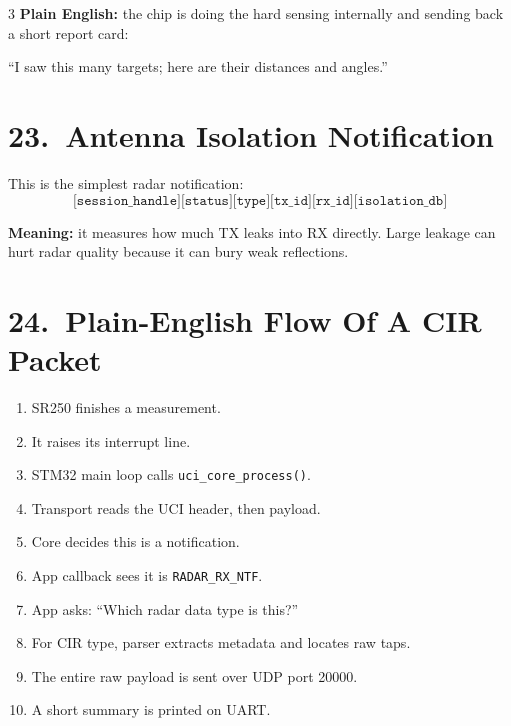 \documentclass[10pt]{article}
\begin{document}
\begin{multicols*}{3}
\textbf{Plain English:}
the chip is doing the hard sensing internally and sending back a short report card:
\begin{center}
``I saw this many targets; here are their distances and angles.''
\end{center}

\section*{23.\ Antenna Isolation Notification}

This is the simplest radar notification:
\[
\texttt{[session\_handle][status][type][tx\_id][rx\_id][isolation\_db]}
\]

\textbf{Meaning:}
it measures how much TX leaks into RX directly.
Large leakage can hurt radar quality because it can bury weak reflections.

\section*{24.\ Plain-English Flow Of A CIR Packet}

\begin{enumerate}
  \item SR250 finishes a measurement.
  \item It raises its interrupt line.
  \item STM32 main loop calls \texttt{uci\_core\_process()}.
  \item Transport reads the UCI header, then payload.
  \item Core decides this is a notification.
  \item App callback sees it is \texttt{RADAR\_RX\_NTF}.
  \item App asks: ``Which radar data type is this?''
  \item For CIR type, parser extracts metadata and locates raw taps.
  \item The entire raw payload is sent over UDP port 20000.
  \item A short summary is printed on UART.
\end{enumerate}


\end{multicols*}
\end{document}
